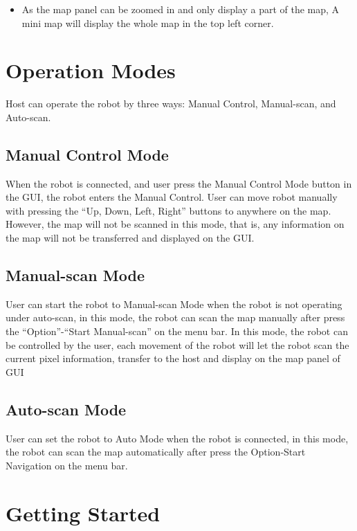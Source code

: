 \documentclass[11pt, a4paper]{report}
\begin{document}
\begin{itemize}
	\item As the map panel can be zoomed in and only display a part of the map, A mini map will display the whole map in the top left corner. \\
\end{itemize}





\chapter{Operation Modes} %
\label{cha:operation_modes}
Host can operate the robot by three ways: Manual Control, Manual-scan, and Auto-scan.


\section{Manual Control Mode}
When the robot is connected, and user press the Manual Control Mode button in the GUI, the robot enters the Manual Control. User can move robot manually with pressing the ``Up, Down, Left, Right'' buttons to anywhere on the map. However, the map will not be scanned in this mode, that is, any information on the map will not be transferred and displayed on the GUI.

\section{Manual-scan Mode}
User can start the robot to Manual-scan Mode when the robot is not operating under auto-scan, in this mode, the robot can scan the map manually after press the ``Option''-``Start Manual-scan'' on the menu bar. In this mode, the robot can be controlled by the user, each movement of the robot will let the robot scan the current pixel information, transfer to the host and display on the map panel of GUI

\section{Auto-scan Mode}
User can set the robot to Auto Mode when the robot is connected, in this mode, the robot can scan the map automatically after press the Option-Start Navigation on the menu bar.

\chapter{Getting Started} %
\label{cha:getting_started}
\end{document}
